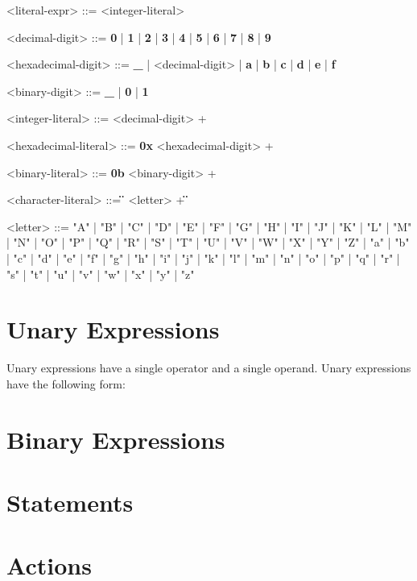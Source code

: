 \begin{minip}
\begin{grammar}
<literal-expr> ::=
<integer-literal>

<decimal-digit> ::= \textbf{0} | \textbf{1} | \textbf{2} | \textbf{3} | \textbf{4} | \textbf{5} | \textbf{6} | \textbf{7} | \textbf{8} | \textbf{9}

<hexadecimal-digit> ::= \textbf{\_} | <decimal-digit> | \textbf{a} | \textbf{b} | \textbf{c} | \textbf{d} | \textbf{e} | \textbf{f}             

<binary-digit> ::= \textbf{\_} | \textbf{0} | \textbf{1}

<integer-literal> ::=
<decimal-digit> +

<hexadecimal-literal> ::=
\textbf{0x} <hexadecimal-digit> +

<binary-literal> ::=
\textbf{0b} <binary-digit> +

<character-literal> ::=
\textbf{\"} <letter> + \textbf{\"}

<letter> ::= "A" | "B" | "C" | "D" | "E" | "F" | "G"
       | "H" | "I" | "J" | "K" | "L" | "M" | "N"
       | "O" | "P" | "Q" | "R" | "S" | "T" | "U"
       | "V" | "W" | "X" | "Y" | "Z" | "a" | "b"
       | "c" | "d" | "e" | "f" | "g" | "h" | "i"
       | "j" | "k" | "l" | "m" | "n" | "o" | "p"
       | "q" | "r" | "s" | "t" | "u" | "v" | "w"
       | "x" | "y" | "z"

\end{grammar}
\end{minip}

\section{Unary Expressions} \label{unary_expr_guide}

Unary expressions have a single operator and a single operand. Unary expressions have the following form:



\section{Binary Expressions} \label{binary_expr_guide}

\section{Statements} \label{statements_guide}

\section{Actions} \label{action_guide}

